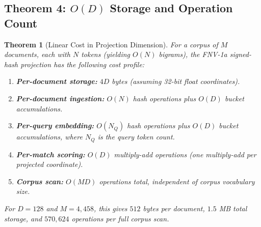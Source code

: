 \documentclass[10pt,twocolumn]{article}
\newtheorem{theorem}{Theorem}
\theoremstyle{definition}
\theoremstyle{remark}
\begin{document}
\subsection{Theorem 4: $O(D)$ Storage and Operation Count}
\label{thm:complexity}

\begin{theorem}[Linear Cost in Projection Dimension]
\label{thm:complexity}
For a corpus of $M$ documents, each with $N$ tokens (yielding
$O(N)$ bigrams), the FNV-1a signed-hash projection has the following
cost profile:
\begin{enumerate}
\item \textbf{Per-document storage:} $4D$ bytes (assuming 32-bit
      float coordinates).
\item \textbf{Per-document ingestion:} $O(N)$ hash operations plus $O(D)$
      bucket accumulations.
\item \textbf{Per-query embedding:} $O(N_Q)$ hash operations plus $O(D)$
      bucket accumulations, where $N_Q$ is the query token count.
\item \textbf{Per-match scoring:} $O(D)$ multiply-add operations (one
      multiply-add per projected coordinate).
\item \textbf{Corpus scan:} $O(M D)$ operations total, independent of
      corpus vocabulary size.
\end{enumerate}
For $D = 128$ and $M = 4{,}458$, this gives $512$ bytes per document,
$1.5$ MB total storage, and $570{,}624$ operations per full corpus scan.
\end{theorem}
\end{document}
